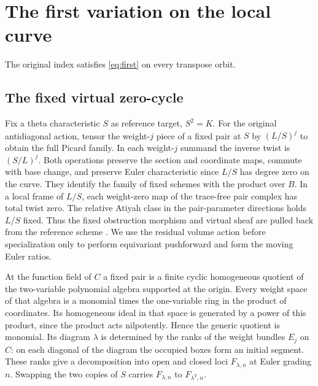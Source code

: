 \section{The first variation on the local curve}\label{sec:original}
\begin{proposition}\label{prop:original}
The original index satisfies \eqref{eq:first} on every transpose orbit.
\end{proposition}
\subsection{The fixed virtual zero-cycle}


Fix a theta characteristic $S$ as reference target, $S^2=K$. For the original antidiagonal action, tensor the weight-$j$ piece of a fixed pair at $S$ by $(L/S)^j$ to obtain the full Picard family. In each weight-$j$ summand the inverse twist is $(S/L)^j$. Both operations preserve the section and coordinate maps, commute with base change, and preserve Euler characteristic since $L/S$ has degree zero on the curve. They identify the family of fixed schemes with the product over $B$. In a local frame of $L/S$, each weight-zero map of the trace-free pair complex has total twist zero. The relative Atiyah class in the pair-parameter directions holds $L/S$ fixed. Thus the fixed obstruction morphism and virtual sheaf are pulled back from the reference scheme \cite[\S2]{W}. We use the residual volume action before specialization only to perform equivariant pushforward and form the moving Euler ratios.

At the function field of $C$ a fixed pair is a finite cyclic homogeneous quotient of the two-variable polynomial algebra supported at the origin. Every weight space of that algebra is a monomial times the one-variable ring in the product of coordinates. Its homogeneous ideal in that space is generated by a power of this product, since the product acts nilpotently. Hence the generic quotient is monomial. Its diagram $\lambda$ is determined by the ranks of the weight bundles $E_j$ on $C$: on each diagonal of the diagram the occupied boxes form an initial segment. These ranks give a decomposition into open and closed loci $F_{\lambda,n}$ at Euler grading $n$. Swapping the two copies of $S$ carries $F_{\lambda,n}$ to $F_{\lambda^T,n}$.

